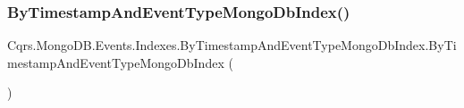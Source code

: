 \subsubsection{\texorpdfstring{By\+Timestamp\+And\+Event\+Type\+Mongo\+Db\+Index()}{ByTimestampAndEventTypeMongoDbIndex()}}
{\footnotesize\ttfamily Cqrs.\+Mongo\+D\+B.\+Events.\+Indexes.\+By\+Timestamp\+And\+Event\+Type\+Mongo\+Db\+Index.\+By\+Timestamp\+And\+Event\+Type\+Mongo\+Db\+Index (\begin{DoxyParamCaption}{ }\end{DoxyParamCaption})}

